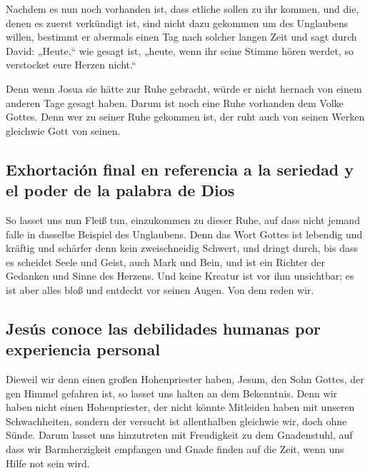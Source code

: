  Nachdem es nun noch vorhanden ist, dass etliche sollen zu
ihr kommen, und die, denen es zuerst verkündigt ist, sind nicht dazu
gekommen um des Unglaubens willen,  bestimmt er abermals
einen Tag nach solcher langen Zeit und sagt durch David: „Heute,`` wie
gesagt ist, „heute, wenn ihr seine Stimme hören werdet, so verstocket
eure Herzen nicht.``

 Denn wenn Josua sie hätte zur Ruhe gebracht, würde er
nicht hernach von einem anderen Tage gesagt haben.  Darum
ist noch eine Ruhe vorhanden dem Volke Gottes.  Denn wer
zu seiner Ruhe gekommen ist, der ruht auch von seinen Werken gleichwie
Gott von seinen.

\hypertarget{exhortaciuxf3n-final-en-referencia-a-la-seriedad-y-el-poder-de-la-palabra-de-dios}{%
\subsection{Exhortación final en referencia a la seriedad y el poder de
la palabra de
Dios}\label{exhortaciuxf3n-final-en-referencia-a-la-seriedad-y-el-poder-de-la-palabra-de-dios}}

 So lasset uns nun Fleiß tun, einzukommen zu dieser Ruhe,
auf dass nicht jemand falle in dasselbe Beispiel des Unglaubens.
 Denn das Wort Gottes ist lebendig und kräftig und
schärfer denn kein zweischneidig Schwert, und dringt durch, bis dass es
scheidet Seele und Geist, auch Mark und Bein, und ist ein Richter der
Gedanken und Sinne des Herzens.  Und keine Kreatur ist
vor ihm unsichtbar; es ist aber alles bloß und entdeckt vor seinen
Augen. Von dem reden wir.

\hypertarget{jesuxfas-conoce-las-debilidades-humanas-por-experiencia-personal}{%
\subsection{Jesús conoce las debilidades humanas por experiencia
personal}\label{jesuxfas-conoce-las-debilidades-humanas-por-experiencia-personal}}

 Dieweil wir denn einen großen Hohenpriester haben,
Jesum, den Sohn Gottes, der gen Himmel gefahren ist, so lasset uns
halten an dem Bekenntnis.  Denn wir haben nicht einen
Hohenpriester, der nicht könnte Mitleiden haben mit unseren
Schwachheiten, sondern der versucht ist allenthalben gleichwie wir, doch
ohne Sünde.  Darum lasset uns hinzutreten mit Freudigkeit
zu dem Gnadenstuhl, auf dass wir Barmherzigkeit empfangen und Gnade
finden auf die Zeit, wenn uns Hilfe not sein wird.


